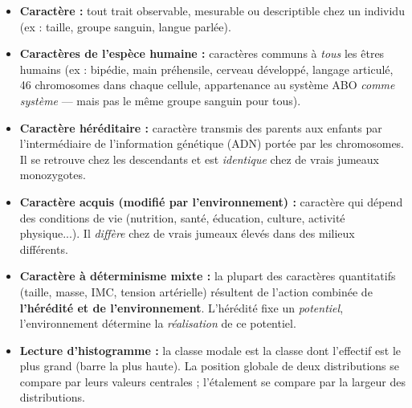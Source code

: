 \documentclass[11pt]{article}
\newcounter{popsec}
\newcounter{popsub}
\newcommand{\courssub}[1]{%
  \stepcounter{popsub}%
  \par\vspace{9pt}\noindent{\popxbold\fontsize{11.5}{13}\selectfont\color{popink}{\color{poporange}\thepopsec.\thepopsub}\hspace{6pt}#1}\par\nopagebreak\vspace{4pt}
}
\begin{document}
\courssub{Ressources à mobiliser}
\begin{aretenir}
\begin{itemize}
    \item \textbf{Caractère :} tout trait observable, mesurable ou descriptible chez un individu (ex : taille, groupe sanguin, langue parlée).
    \item \textbf{Caractères de l'espèce humaine :} caractères communs à \emph{tous} les êtres humains (ex : bipédie, main préhensile, cerveau développé, langage articulé, 46 chromosomes dans chaque cellule, appartenance au système ABO \emph{comme système} — mais pas le même groupe sanguin pour tous).
    \item \textbf{Caractère héréditaire :} caractère transmis des parents aux enfants par l'intermédiaire de l'information génétique (ADN) portée par les chromosomes. Il se retrouve chez les descendants et est \emph{identique} chez de vrais jumeaux monozygotes.
    \item \textbf{Caractère acquis (modifié par l'environnement) :} caractère qui dépend des conditions de vie (nutrition, santé, éducation, culture, activité physique...). Il \emph{diffère} chez de vrais jumeaux élevés dans des milieux différents.
    \item \textbf{Caractère à déterminisme mixte :} la plupart des caractères quantitatifs (taille, masse, IMC, tension artérielle) résultent de l'action combinée de \textbf{l'hérédité et de l'environnement}. L'hérédité fixe un \emph{potentiel}, l'environnement détermine la \emph{réalisation} de ce potentiel.
    \item \textbf{Lecture d'histogramme :} la classe modale est la classe dont l'effectif est le plus grand (barre la plus haute). La position globale de deux distributions se compare par leurs valeurs centrales ; l'étalement se compare par la largeur des distributions.
\end{itemize}
\end{aretenir}
\end{document}
